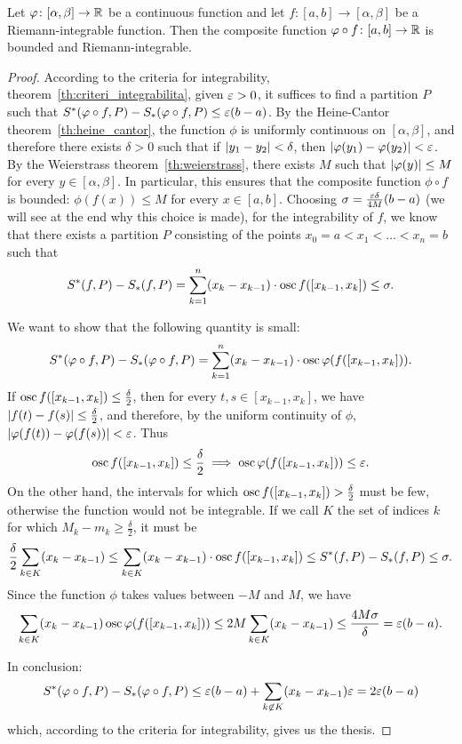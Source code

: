 \begin{theorem}
  \label{th:composta_integrabile}%
    Let $\varphi\colon [\alpha,\beta]\to {\mathbb R}$ be a continuous function and let
  $f\colon [a,b]\to [\alpha,\beta]$ be a Riemann-integrable function.
  Then the composite function 
  $\varphi\circ f\colon[a,b]\to {\mathbb R}$ is 
  bounded and Riemann-integrable.
\end{theorem}
%
\begin{proof}
According to the criteria for integrability,
theorem~\ref{th:criteri_integrabilita},
given $\varepsilon>0$, it suffices to find a partition $P$
such that $S^*(\varphi\circ f,P) - S_*(\varphi\circ f,P)\le \varepsilon(b-a)$.
By the Heine-Cantor theorem~\ref{th:heine_cantor}, 
the function $\phi$ is uniformly continuous on $[\alpha,\beta]$, 
and therefore there exists $\delta>0$ such that if ${\left|y_1-y_2\right|}< \delta$,
then ${\left|\varphi(y_1)-\varphi(y_2)\right|}< \varepsilon$. 
By the Weierstrass theorem~\ref{th:weierstrass}, 
there exists $M$ such that ${\left|\varphi(y)\right|}\le M$ for every $y\in [\alpha,\beta]$.
In particular, this ensures that the composite function $\phi \circ f$ 
is bounded: $\phi(f(x))\le M$ for every $x\in [a,b]$.
Choosing $\sigma = \frac{\varepsilon \delta}{4M} (b-a)$ 
(we will see at the end why this choice is made),
for the integrability of $f$, we know that 
there exists a partition $P$ consisting 
of the points $x_0=a < x_1 < \dots < x_n=b$ such that 
%
\[
  S^*(f,P) - S_*(f,P) 
  = \sum_{k=1}^n (x_k - x_{k-1})
  \cdot \operatorname{osc} f([x_{k-1},x_k])
  \le \sigma.
\]

We want to show that the following quantity is small:
\[
 S^*(\varphi\circ f,P) - S_*(\varphi\circ f,P)
 = \sum_{k=1}^n (x_k - x_{k-1}) \cdot \operatorname{osc} \varphi(f([x_{k-1},x_k])).
\]
If $\operatorname{osc} f([x_{k-1},x_k]) \le \frac{\delta }2$, 
then for every $t,s\in[x_{k-1},x_k]$, we have 
${\left|f(t)-f(s)\right|}\le \frac{\delta}{2}$,
and therefore, by the uniform continuity of $\phi$,
${\left|\varphi(f(t))-\varphi(f(s))\right|}<\varepsilon$.
Thus 
\[
  \operatorname{osc} f([x_{k-1},x_k]) \le \frac{\delta}{2} 
  \implies  
  \operatorname{osc} \varphi(f([x_{k-1},x_k]))\le \varepsilon.
\] 
On the other hand, the intervals for which 
$\operatorname{osc} f([x_{k-1},x_k]) > \frac{\delta}{2}$ 
must be few, otherwise the function would not be 
integrable.
If we call $K$ the set of indices $k$ for which 
$M_k-m_k\ge \frac \delta 2$, it must be 
\[
  \frac{\delta}{2}\sum_{k\in K} (x_k-x_{k-1})
  \le \sum_{k\in K} (x_k-x_{k-1})\cdot \operatorname{osc} f([x_{k-1},x_k])
  \le S^*(f,P) - S_*(f,P) \le \sigma.
\]
Since the function $\phi$ takes values between $-M$ and $M$, 
we have  
\[
   \sum_{k\in K} (x_k-x_{k-1})
   \operatorname{osc} \varphi(f([x_{k-1},x_k]))
   \le 2M \sum_{k\in K} (x_k-x_{k-1})
   \le \frac{4M\sigma}{\delta} = \varepsilon (b-a).
\]

In conclusion: 
\begin{align*}
  S^*(\varphi\circ f,P)-S_*(\varphi\circ f,P)
  \le 
  \varepsilon (b-a) + 
  \sum_{k\not \in K} (x_k-x_{k-1}) \varepsilon
  = 2\varepsilon (b-a)
\end{align*}
which, according to the criteria for integrability, gives us the thesis.
\end{proof}

